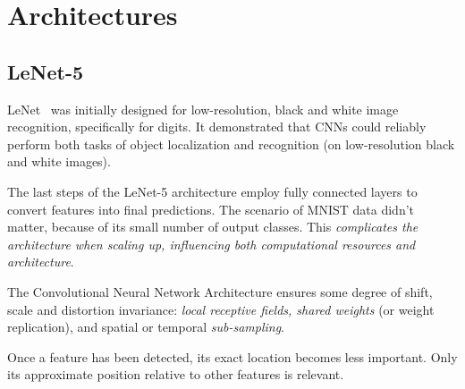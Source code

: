 \documentclass[11pt]{article}
\begin{document}


\tableofcontents

\clearpage

\section{Architectures}

\subsection{LeNet-5}

LeNet~\cite{LeNet} was initially designed for low-resolution, black and white image recognition, specifically for digits. It demonstrated that CNNs could reliably perform both tasks of object localization and recognition (on low-resolution black and white images).

The last steps of the LeNet-5 architecture employ fully connected layers to convert features into final predictions. The scenario of MNIST data didn't matter, because of its small number of output classes. This \textit{complicates the architecture when scaling up, influencing both computational resources and architecture}.

The Convolutional Neural Network Architecture ensures some degree of shift, scale and distortion invariance: \textit{local receptive fields, shared weights} (or weight replication), and spatial or temporal \textit{sub-sampling}.

Once a feature has been detected, its exact location
becomes less important. Only its approximate position
relative to other features is relevant.



\end{document}
